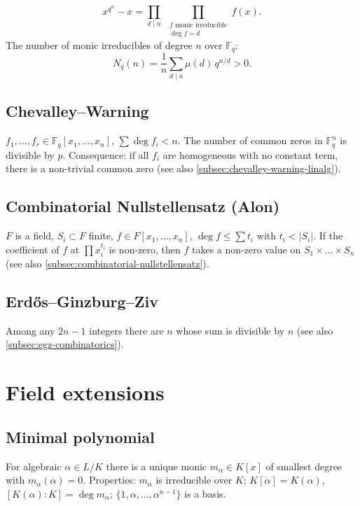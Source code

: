 $$x^{q^n}-x=\prod_{d\mid n}\;\prod_{\substack{f\text{ monic irreducible}\\\deg f=d}} f(x).$$
The number of monic irreducibles of degree $n$ over $\mathbb{F}_q$:
$$N_q(n)=\frac1n\sum_{d\mid n}\mu(d)\,q^{n/d}>0.$$

\subsection{Chevalley--Warning}
\label{subsec:chevalley-warning}

$f_1,\dots,f_r\in\mathbb{F}_q[x_1,\dots,x_n]$, $\sum\deg f_i<n$. The number of common zeros in $\mathbb{F}_q^n$ is divisible by $p$.
Consequence: if all $f_i$ are homogeneous with no constant term, there is a non-trivial common zero (see also \ref{subsec:chevalley-warning-linalg}).

\subsection{Combinatorial Nullstellensatz (Alon)}
\label{subsec:combinatorial-nullstellensatz-poly}

$F$ is a field, $S_i\subset F$ finite, $f\in F[x_1,\dots,x_n]$, $\deg f\le\sum t_i$ with $t_i<|S_i|$. If the coefficient of $f$ at $\prod x_i^{t_i}$ is non-zero, then $f$ takes a non-zero value on $S_1\times\dots\times S_n$ (see also \ref{subsec:combinatorial-nullstellensatz}).

\subsection{Erd\H{o}s--Ginzburg--Ziv}
\label{subsec:egz-poly}

Among any $2n-1$ integers there are $n$ whose sum is divisible by $n$ (see also \ref{subsec:egz-combinatorics}).

\medskip

\section{Field extensions}
\label{sec:field-extensions}

\subsection{Minimal polynomial}
\label{subsec:minimal-polynomial-field}

For algebraic $\alpha\in L/K$ there is a unique monic $m_\alpha\in K[x]$ of smallest degree with $m_\alpha(\alpha)=0$. Properties: $m_\alpha$ is irreducible over $K$; $K[\alpha]=K(\alpha)$, $[K(\alpha):K]=\deg m_\alpha$; $\{1,\alpha,\dots,\alpha^{n-1}\}$ is a basis.

